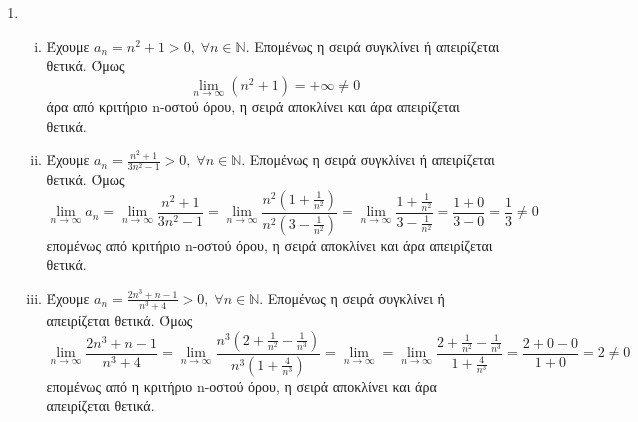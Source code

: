


\everymath{\displaystyle}
\pagestyle{askhseis}

\setcounter{chapter}{1}




\begin{center}
  \minibox[c]{\large \bfseries  \textcolor{Col1}{Σειρές (Ασκήσεις)} \\ 
  \large \bfseries \textcolor{Col1}{(λύσεις)}}
\end{center}

\vspace{\baselineskip}

\begin{enumerate}
  \item 
    \begin{enumerate}[i)]
      \item Έχουμε $ a_{n}= n^{2}+1 > 0, \; \forall n \in 
        \mathbb{N} $. Επομένως η σειρά συγκλίνει ή απειρίζεται θετικά.
        Όμως
        \[ \lim_{n \to \infty} (n^{2}+1) = + \infty \neq 0 \] άρα από 
        κριτήριο n-οστού όρου, η σειρά αποκλίνει και άρα απειρίζεται θετικά.
      \item Έχουμε $ a_{n}= \frac{n^{2}+1}{3n^{2}-1} > 0, \; \forall n \in 
        \mathbb{N} $. Επομένως η σειρά συγκλίνει ή απειρίζεται θετικά.
        Όμως \[ \lim_{n \to \infty} a_{n} = \lim_{n \to \infty} 
          \frac{n^{2}+1}{3n^{2}-1} = \lim_{n \to \infty} 
          \frac{n^{2}(1+ \frac{1}{n^{{2}}})}{n^{2}(3- \frac{1}{n^{2}})} = 
          \lim_{n \to \infty} \frac{1 + \frac{1}{n^{2}}}{3- \frac{1}{n^{2}}} = 
          \frac{1+0}{3-0} = \frac{1}{3} \neq 0
        \] επομένως από κριτήριο n-οστού όρου, η σειρά αποκλίνει και άρα απειρίζεται 
        θετικά.

      \item Έχουμε $ a_{n}= \frac{2n^{3}+n-1}{n^{3}+4} > 0, \; \forall n \in 
        \mathbb{N} $. Επομένως η σειρά συγκλίνει ή απειρίζεται θετικά.
        Όμως
        \[
          \lim_{n \to \infty} \frac{2n^{3}+n-1}{n^{3}+4} = \lim_{n \to \infty}
          \frac{n^{3}(2+ \frac{1}{n^{2}}- \frac{1}{n^{3}})}{n^{3}
          (1+ \frac{4}{n^{3}})} = \lim_{n \to \infty} = 
          \lim_{n \to \infty} \frac{2+ \frac{1}{n^{2}}- 
          \frac{1}{n^{3}}}{1 + \frac{4}{n^{3}}} =  
          \frac{2+0-0}{1+0} = 2 \neq 0
        \]
        επομένως από η κριτήριο n-οστού όρου, η σειρά αποκλίνει και 
        άρα απειρίζεται θετικά. 
    \end{enumerate}


\end{enumerate}
